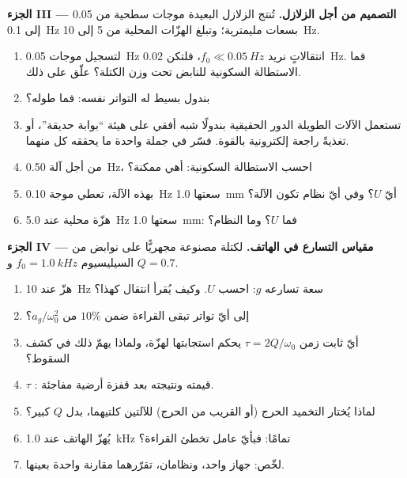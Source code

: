 \begin{problem}
\medskip
\noindent\textbf{الجزء III --- التصميم من أجل الزلازل.}
تُنتج الزلازل البعيدة موجات سطحية من \qty{0.05}{} إلى \qty{0.1}{Hz}
بسعات مليمترية؛ وتبلغ الهزّات المحلية من \qty{5}{} إلى \qty{10}{Hz}.
\begin{enumerate}[resume]
  \item لتسجيل موجات \qty{0.05}{Hz} انتقالاتٍ نريد
        $f_0 \ll \qty{0.05}{Hz}$، فلتكن \qty{0.02}{Hz}. فما الاستطالة
        السكونية للنابض تحت وزن الكتلة؟ علّق على ذلك.
  \item بندول بسيط له التواتر نفسه: فما طوله؟
  \item تستعمل الآلات الطويلة الدور الحقيقية بندولًا شبه أفقي
        على هيئة ``بوابة حديقة''، أو تغذيةً راجعة إلكترونية بالقوة. فسّر
        في جملة واحدة ما يحققه كل منهما.
  \item من أجل آلة \qty{0.50}{Hz}، احسب الاستطالة السكونية:
        أهي ممكنة؟
  \item بهذه الآلة، تعطي موجة \qty{0.10}{Hz} سعتها \qty{1.0}{mm}
        أيّ $U$؟ وفي أيّ نظام تكون الآلة؟
  \item هزّة محلية عند \qty{5.0}{Hz} سعتها \qty{1.0}{mm}: فما $U$؟
        وما النظام؟
\end{enumerate}

\medskip
\noindent\textbf{الجزء IV --- مقياس التسارع في الهاتف.}
لكتلة مصنوعة مجهريًّا على نوابض من السيليسيوم $f_0 = \qty{1.0}{kHz}$ و
$Q = 0.7$.
\begin{enumerate}[resume]
  \item هزّ عند \qty{10}{Hz} سعة تسارعه $g$: احسب
        $U$. وكيف يُقرأ انتقال كهذا؟
  \item إلى أيّ تواتر تبقى القراءة ضمن $10\%$ من $a_g/\omega_0^2$؟
  \item أيّ ثابت زمن $\tau = 2Q/\omega_0$ يحكم استجابتها
        لهزّة، ولماذا يهمّ ذلك في كشف السقوط؟
  \item {} $\tau$ : قيمته ونتيجته بعد
        قفزة أرضية مفاجئة.
  \item لماذا يُختار التخميد الحرج (أو القريب من الحرج) للآلتين
        كلتيهما، بدل $Q$ كبير؟
  \item يُهزّ الهاتف عند \qty{1.0}{kHz} تمامًا: فبأيّ عامل تخطئ
        القراءة؟
  \item لخّص: جهاز واحد، ونظامان، تقرّرهما مقارنة واحدة
        بعينها.
\end{enumerate}
\end{problem}
